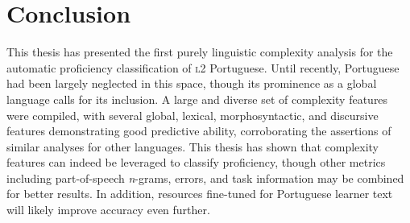 
\pagebreak

\section{Conclusion}

This thesis has presented the first purely linguistic complexity analysis for the automatic proficiency classification of {\scshape l2} Portuguese. Until recently, Portuguese had been largely neglected in this space, though its prominence as a global language calls for its inclusion. A large and diverse set of complexity features were compiled, with several global, lexical, morphosyntactic, and discursive features demonstrating good predictive ability, corroborating the assertions of similar analyses for other languages. This thesis has shown that complexity features can indeed be leveraged to classify proficiency, though other metrics including part-of-speech \textit{n}-grams, errors, and task information may be combined for better results. In addition, resources fine-tuned for Portuguese learner text will likely improve accuracy even further.

\pagebreak
